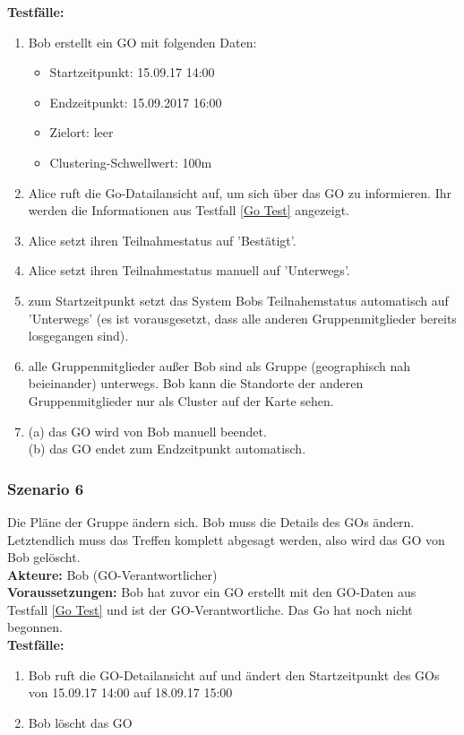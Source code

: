 \documentclass[parskip=full]{scrartcl}
\def\threedigits#1{%
  \ifnum#1<100 0\fi
  \ifnum#1<10 0\fi
  \number#1}
\begin{document}
\textbf{Testfälle:}
\begin{enumerate}[label={\textbf{/T\protect\threedigits{\theenumi}0/}}, leftmargin=*, resume]
	\item\label{Go Test} Bob erstellt ein GO mit folgenden Daten:
	\begin{itemize}
		\item Startzeitpunkt: 15.09.17 14:00
		\item Endzeitpunkt: 15.09.2017 16:00
		\item Zielort: leer
		\item Clustering-Schwellwert: 100m
	\end{itemize}
	\item Alice ruft die Go-Datailansicht auf, um sich über das GO zu informieren. Ihr werden die Informationen aus Testfall \ref{Go Test} angezeigt.
		\item Alice setzt ihren Teilnahmestatus auf 'Bestätigt'.
	\item Alice setzt ihren Teilnahmestatus manuell auf 'Unterwegs'.
	\item zum Startzeitpunkt setzt das System Bobs Teilnahemstatus automatisch auf 'Unterwegs' (es ist vorausgesetzt, dass alle anderen Gruppenmitglieder bereits losgegangen sind).
	\item alle Gruppenmitglieder außer Bob sind als Gruppe (geographisch nah beieinander) unterwegs. Bob kann die Standorte der anderen Gruppenmitglieder nur als Cluster auf der Karte sehen.
	\item (a) das GO wird von Bob manuell beendet. \\
	 (b) das GO endet zum Endzeitpunkt automatisch.	
\end{enumerate}

\subsubsection*{Szenario 6} Die Pläne der Gruppe ändern sich. Bob muss die Details des GOs ändern. Letztendlich muss das Treffen komplett abgesagt werden, also wird das GO von Bob gelöscht.\\

\textbf{Akteure:} Bob (GO-Verantwortlicher)\\

\textbf{Voraussetzungen: }Bob hat zuvor ein GO erstellt mit den GO-Daten aus Testfall \ref{Go Test} und ist der GO-Verantwortliche. Das Go hat noch nicht begonnen.\\

\textbf{Testfälle:}\\
\begin{enumerate}[label={\textbf{/T\protect\threedigits{\theenumi}0/}}, leftmargin=*, resume]
	\item Bob ruft die GO-Detailansicht auf und ändert den Startzeitpunkt des GOs von 15.09.17 14:00 auf 18.09.17 15:00
	\item Bob löscht das GO
\end{enumerate}
\end{document}

